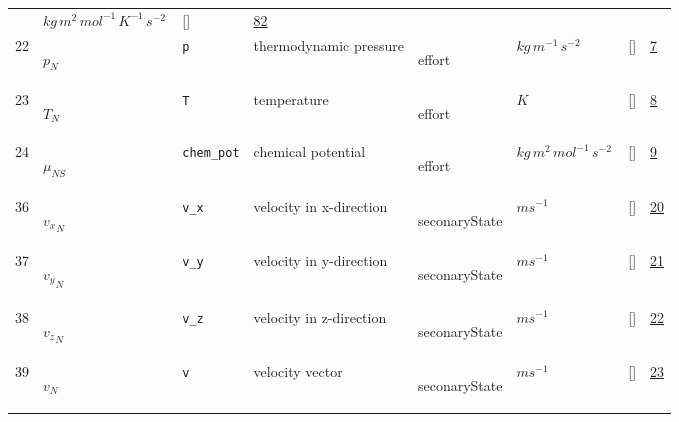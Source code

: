 \begin{longtable}{|p{1cm}|p{3cm}|p{3cm}|p{7cm}|p{3.0cm}|p{3cm}|p{2cm}|p{1cm}|}
             & $ kg \,m^{2} \,mol^{-1} \,K^{-1} \,s^{-2} \, $
             & []
             & \hyperlink{"e:82"}{ 82 }
                 \\
    22
             & \hypertarget{"v:22"}{ $ {p}_{N} $}
             & \verb|p|
             & thermodynamic pressure
             & \begin{lay}effort \end{lay}
             & $ kg \,m^{-1} \,s^{-2} \, $
             & []
             & \hyperlink{"e:7"}{ 7 }
                 \\
    23
             & \hypertarget{"v:23"}{ $ {T}_{N} $}
             & \verb|T|
             & temperature
             & \begin{lay}effort \end{lay}
             & $ K \, $
             & []
             & \hyperlink{"e:8"}{ 8 }
                 \\
    24
             & \hypertarget{"v:24"}{ $ {\mu}_{{N S}} $}
             & \verb|chem_pot|
             & chemical potential
             & \begin{lay}effort \end{lay}
             & $ kg \,m^{2} \,mol^{-1} \,s^{-2} \, $
             & []
             & \hyperlink{"e:9"}{ 9 }
                 \\
    36
             & \hypertarget{"v:36"}{ $ {v_x}_{N} $}
             & \verb|v_x|
             & velocity in x-direction
             & \begin{lay}seconaryState \end{lay}
             & $ m s^{-1} \, $
             & []
             & \hyperlink{"e:20"}{ 20 }
                 \\
    37
             & \hypertarget{"v:37"}{ $ {v_y}_{N} $}
             & \verb|v_y|
             & velocity in y-direction
             & \begin{lay}seconaryState \end{lay}
             & $ m s^{-1} \, $
             & []
             & \hyperlink{"e:21"}{ 21 }
                 \\
    38
             & \hypertarget{"v:38"}{ $ {v_z}_{N} $}
             & \verb|v_z|
             & velocity in z-direction
             & \begin{lay}seconaryState \end{lay}
             & $ m s^{-1} \, $
             & []
             & \hyperlink{"e:22"}{ 22 }
                 \\
    39
             & \hypertarget{"v:39"}{ $ {v}_{N} $}
             & \verb|v|
             & velocity vector
             & \begin{lay}seconaryState \end{lay}
             & $ m s^{-1} \, $
             & []
             & \hyperlink{"e:23"}{ 23 }
                 \\
    \end{longtable}